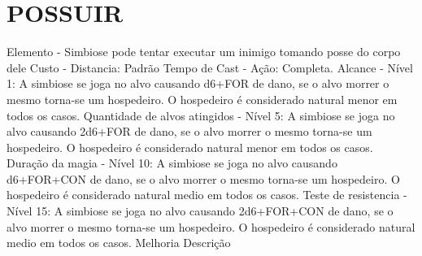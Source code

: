 \documentclass{article}%
\begin{document}
\section{POSSUIR}%
\label{sec:POSSUIR}%
Elemento {-}  Simbiose pode tentar executar um inimigo tomando posse do corpo dele\newline%
Custo {-} Distancia: Padrão\newline%
Tempo de Cast {-} Ação: Completa.\newline%
Alcance {-} Nível 1: A simbiose se joga no alvo causando d6+FOR de dano, se o alvo morrer o mesmo torna{-}se um hospedeiro. O hospedeiro é considerado natural menor em todos os casos.\newline%
Quantidade de alvos atingidos {-} Nível 5: A simbiose se joga no alvo causando 2d6+FOR de dano, se o alvo morrer o mesmo torna{-}se um hospedeiro. O hospedeiro é considerado natural menor em todos os casos.\newline%
Duração da magia {-} Nível 10: A simbiose se joga no alvo causando d6+FOR+CON de dano, se o alvo morrer o mesmo torna{-}se um hospedeiro. O hospedeiro é considerado natural medio em todos os casos.\newline%
Teste de resistencia {-} Nível 15: A simbiose se joga no alvo causando 2d6+FOR+CON de dano, se o alvo morrer o mesmo torna{-}se um hospedeiro. O hospedeiro é considerado natural medio em todos os casos.\newline%
Melhoria \newline%
Descrição \newline%

%
\end{document}
